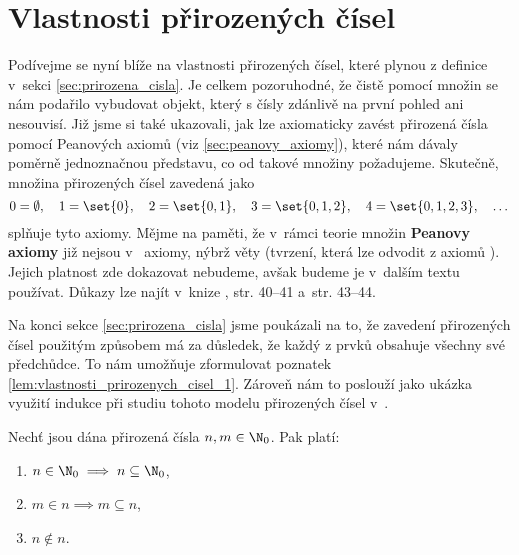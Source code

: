 \section{Vlastnosti přirozených čísel}\label{sec:vlastnosti_prirozenych_cisel}
Podívejme se nyní blíže na vlastnosti přirozených čísel, které plynou z definice v~sekci \ref{sec:prirozena_cisla}. Je celkem pozoruhodné, že čistě pomocí množin se nám podařilo vybudovat objekt, který s čísly zdánlivě na první pohled ani nesouvisí. Již jsme si také ukazovali, jak lze axiomaticky zavést přirozená čísla pomocí Peanových axiomů (viz \ref{sec:peanovy_axiomy}), které nám dávaly poměrně jednoznačnou představu, co od takové množiny požadujeme. Skutečně, množina přirozených čísel zavedená jako
\begin{equation*}
    0=\emptyset,\quad 1=\set{0},\quad 2=\set{0,1},\quad 3=\set{0,1,2},\quad 4=\set{0,1,2,3},\quad\dots
\end{equation*}
splňuje tyto axiomy. Mějme na paměti, že v~rámci teorie množin \textbf{Peanovy axiomy} již nejsou v~\ZF{} axiomy, nýbrž věty (tvrzení, která lze odvodit z axiomů \ZF{}). Jejich platnost zde dokazovat nebudeme, avšak budeme je v~dalším textu používat. Důkazy lze najít v~knize \cite{Goldrei2017}, str. 40--41 a~str. 43--44.\par
Na konci sekce \ref{sec:prirozena_cisla} jsme poukázali na to, že zavedení přirozených čísel použitým způsobem má za důsledek, že každý z prvků obsahuje všechny své předchůdce.
To nám umožňuje zformulovat poznatek \ref{lem:vlastnosti_prirozenych_cisel_1}. Zároveň nám to poslouží jako ukázka využití indukce při studiu tohoto modelu přirozených čísel v~\ZF{}.
\begin{lemma}\label{lem:vlastnosti_prirozenych_cisel_1}
    Nechť jsou dána přirozená čísla $n,m\in\N_0$. Pak platí:
    \begin{enumerate}[label=(\roman*)]
        \item\label{item:vlastnost_1_1} $n\in\N_0\implies n\subseteq\N_0$,
        \item\label{item:vlastnost_1_2} $m\in n\implies m\subseteq n$,
        \item\label{item:vlastnost_1_3} $n\notin n$.
    \end{enumerate}
\end{lemma}
